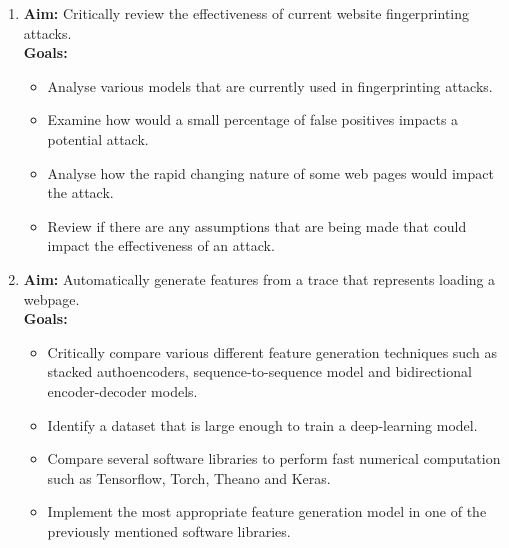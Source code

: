 \begin{enumerate}
   \item \textbf{Aim:} Critically review the effectiveness of current website fingerprinting attacks.\\
   \textbf{Goals:}
   \begin{itemize}
      \item Analyse various models that are currently used in fingerprinting attacks.
      \item Examine how would a small percentage of false positives impacts a potential attack.
      \item Analyse how the rapid changing nature of some web pages would impact the attack.
      \item Review if there are any assumptions that are being made that could impact the effectiveness of an attack.
   \end{itemize}

   \item \textbf{Aim:} Automatically generate features from a trace that represents loading a webpage.\\
   \textbf{Goals:}
   \begin{itemize}
      \item Critically compare various different feature generation techniques such as stacked authoencoders, sequence-to-sequence model and bidirectional encoder-decoder models.
      \item Identify a dataset that is large enough to train a deep-learning model.
      \item Compare several software libraries to perform fast numerical computation such as Tensorflow, Torch, Theano and Keras.
      \item Implement the most appropriate feature generation model in one of the previously mentioned software libraries.
   \end{itemize}


\end{enumerate}
